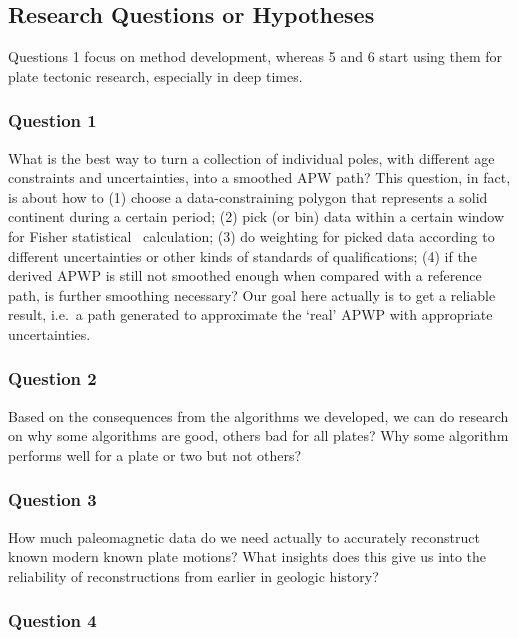 \subsection{Research Questions or Hypotheses}

Questions 1 focus on method development, whereas 5 and 6 start
using them for plate tectonic research, especially in deep times.

\subsubsection{Question 1}

What is the best way to turn a collection of individual poles, with different
age constraints and uncertainties, into a smoothed APW path? This question, in
fact, is about how to (1) choose a data-constraining polygon that represents a
solid continent during a certain period; (2) pick (or bin) data within a certain
window for Fisher statistical~\cite{F53} calculation; (3) do weighting for
picked data according to different uncertainties or other kinds of standards of
qualifications; (4) if the derived APWP is still not smoothed enough when
compared with a reference path, is further smoothing necessary? Our goal here
actually is to get a reliable result, i.e.\ a path generated to approximate the
`real' APWP with appropriate uncertainties.

\subsubsection{Question 2}

Based on the consequences from the algorithms we developed, we can do research
on why some algorithms are good, others bad for all plates? Why some algorithm
performs well for a plate or two but not others?

\subsubsection{Question 3}

How much paleomagnetic data do we need actually to accurately reconstruct known
modern known plate motions? What insights does this give us into the
reliability of reconstructions from earlier in geologic history?

\subsubsection{Question 4}

